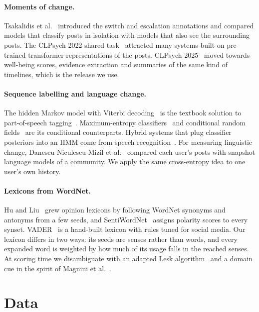 \documentclass[runningheads]{llncs}
\begin{document}
\paragraph{Moments of change.}
Tsakalidis et al.~\cite{tsakalidis2022identifying} introduced the switch and escalation annotations and compared models that classify posts in isolation with models that also see the surrounding posts. The CLPsych 2022 shared task~\cite{tsakalidis2022overview} attracted many systems built on pre-trained transformer representations of the posts. CLPsych 2025~\cite{tseriotou2025overview} moved towards well-being scores, evidence extraction and summaries of the same kind of timelines, which is the release we use.

\paragraph{Sequence labelling and language change.}
The hidden Markov model with Viterbi decoding~\cite{rabiner1989tutorial,viterbi1967error} is the textbook solution to part-of-speech tagging~\cite{brants2000tnt}. Maximum-entropy classifiers~\cite{berger1996maximum} and conditional random fields~\cite{lafferty2001conditional} are its conditional counterparts. Hybrid systems that plug classifier posteriors into an HMM come from speech recognition~\cite{bourlard1994connectionist}. For measuring linguistic change, Danescu-Niculescu-Mizil et al.~\cite{danescu2013no} compared each user's posts with snapshot language models of a community. We apply the same cross-entropy idea to one user's own history.

\paragraph{Lexicons from WordNet.}
Hu and Liu~\cite{hu2004mining} grew opinion lexicons by following WordNet synonyms and antonyms from a few seeds, and SentiWordNet~\cite{esuli2006sentiwordnet} assigns polarity scores to every synset. VADER~\cite{hutto2014vader} is a hand-built lexicon with rules tuned for social media. Our lexicon differs in two ways: its seeds are senses rather than words, and every expanded word is weighted by how much of its usage falls in the reached senses. At scoring time we disambiguate with an adapted Lesk algorithm~\cite{lesk1986automatic,banerjee2002adapted} and a domain cue in the spirit of Magnini et al.~\cite{magnini2002role}.

\section{Data}
\end{document}

